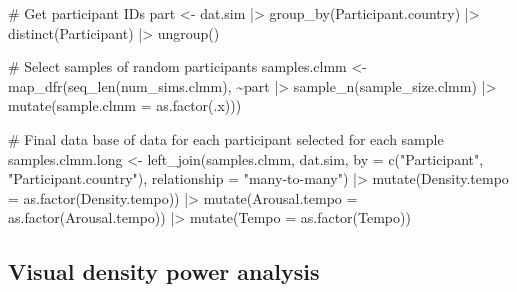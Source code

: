 \documentclass[
  bookmarksnumbered]{article}
\newenvironment{Shaded}{\begin{snugshade}}{\end{snugshade}}
\newcommand{\AttributeTok}[1]{\textcolor[rgb]{0.80,0.80,0.80}{#1}}
\newcommand{\CommentTok}[1]{\textcolor[rgb]{0.50,0.62,0.50}{#1}}
\newcommand{\FunctionTok}[1]{\textcolor[rgb]{0.94,0.94,0.56}{#1}}
\newcommand{\NormalTok}[1]{\textcolor[rgb]{0.80,0.80,0.80}{#1}}
\newcommand{\OtherTok}[1]{\textcolor[rgb]{0.94,0.94,0.56}{#1}}
\newcommand{\SpecialCharTok}[1]{\textcolor[rgb]{0.86,0.64,0.64}{#1}}
\newcommand{\StringTok}[1]{\textcolor[rgb]{0.80,0.58,0.58}{#1}}
\begin{document}
\begin{Shaded}
\begin{Highlighting}[]
\CommentTok{\# Get participant IDs}
\NormalTok{part }\OtherTok{\textless{}{-}}\NormalTok{ dat.sim  }\SpecialCharTok{|\textgreater{}} 
  \FunctionTok{group\_by}\NormalTok{(Participant.country) }\SpecialCharTok{|\textgreater{}}
  \FunctionTok{distinct}\NormalTok{(Participant) }\SpecialCharTok{|\textgreater{}}
  \FunctionTok{ungroup}\NormalTok{()}

\CommentTok{\# Select samples of random participants }
\NormalTok{samples.clmm }\OtherTok{\textless{}{-}} \FunctionTok{map\_dfr}\NormalTok{(}\FunctionTok{seq\_len}\NormalTok{(num\_sims.clmm), }\SpecialCharTok{\textasciitilde{}}\NormalTok{part }\SpecialCharTok{|\textgreater{}}
                        \FunctionTok{sample\_n}\NormalTok{(sample\_size.clmm) }\SpecialCharTok{|\textgreater{}}
                        \FunctionTok{mutate}\NormalTok{(}\AttributeTok{sample.clmm =} \FunctionTok{as.factor}\NormalTok{(.x)))}

\CommentTok{\# Final data base of data for each participant selected for each sample}
\NormalTok{samples.clmm.long }\OtherTok{\textless{}{-}} \FunctionTok{left\_join}\NormalTok{(samples.clmm, dat.sim, }\AttributeTok{by =} \FunctionTok{c}\NormalTok{(}\StringTok{"Participant"}\NormalTok{, }
                                                             \StringTok{"Participant.country"}\NormalTok{),}
                                \AttributeTok{relationship =} \StringTok{"many{-}to{-}many"}\NormalTok{) }\SpecialCharTok{|\textgreater{}}
  \FunctionTok{mutate}\NormalTok{(}\AttributeTok{Density.tempo =} \FunctionTok{as.factor}\NormalTok{(Density.tempo)) }\SpecialCharTok{|\textgreater{}}
  \FunctionTok{mutate}\NormalTok{(}\AttributeTok{Arousal.tempo =} \FunctionTok{as.factor}\NormalTok{(Arousal.tempo)) }\SpecialCharTok{|\textgreater{}}
  \FunctionTok{mutate}\NormalTok{(}\AttributeTok{Tempo =} \FunctionTok{as.factor}\NormalTok{(Tempo))}
\end{Highlighting}
\end{Shaded}

\hypertarget{visual-density-power-analysis}{%
\subsection{Visual density power analysis}\label{visual-density-power-analysis}}
\end{document}
